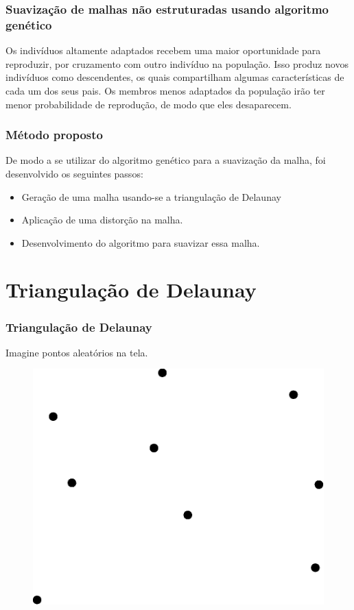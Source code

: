 \documentclass{beamer}
\begin{document}
\begin{frame}
  \frametitle{Suavização de malhas não estruturadas usando algoritmo genético}
  Os indivíduos altamente adaptados recebem uma maior oportunidade para reproduzir, por cruzamento com outro indivíduo na população. Isso produz novos indivíduos como descendentes, os quais compartilham algumas características de cada um dos seus pais. Os membros menos adaptados da população irão ter menor probabilidade de reprodução, de modo que eles desaparecem.
\end{frame}

\begin{frame}
  \frametitle{Método proposto}

  De modo a se utilizar do algoritmo genético para a suavização da malha, foi desenvolvido os seguintes passos:

  \begin{itemize}
    \item Geração de uma malha usando-se a triangulação de Delaunay
    \item Aplicação de uma distorção na malha.
    \item Desenvolvimento do algoritmo para suavizar essa malha.
  \end{itemize}
\end{frame}

\section{Triangulação de Delaunay}

\begin{frame}
  \frametitle{Triangulação de Delaunay}
  Imagine pontos aleatórios na tela.
  \begin{figure}
    \includegraphics[width=0.5\linewidth]{dela1.eps}
  \end{figure}
\end{frame}
\end{document}
